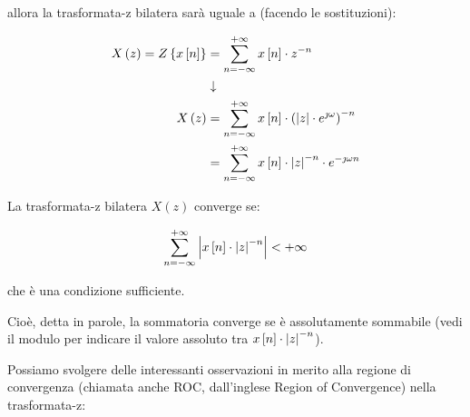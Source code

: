 allora la trasformata-z bilatera sarà uguale a (facendo le sostituzioni): 

{
    \Large 
    \begin{equation}
        \begin{split}
        X \left(z\right)
        = 
        Z \left\{ 
            x \left[ n\right]
        \right\}
        &= 
        \sum_{n = - \infty}^{+ \infty}
        x \left[ n\right]
        \cdot 
        z^{-n}
        \\
        &\downarrow
        \\
        X \left(z\right)
        &=
        \sum_{n = - \infty}^{+ \infty}
        x \left[ n\right]
        \cdot 
        \left(
            \abs{z} \cdot e^{\jmath \omega}
        \right)^{-n}
        \\
        &=
        \sum_{n = - \infty}^{+ \infty}
        x \left[ n\right]
        \cdot 
        \abs{z}^{-n} 
        \cdot 
        e^{-\jmath \omega n}
        \end{split}
    \end{equation}
}

La trasformata-z bilatera $X \left(z\right)$ converge se: 

{
    \Large 
    \begin{equation}
        \sum_{n = - \infty}^{+ \infty}
        \abs{
        x \left[ n\right]
        \cdot 
        \abs{z}^{-n}
        }
        < 
        + \infty
    \end{equation}
}

che è una condizione sufficiente. \newline 

Cioè, detta in parole, la sommatoria converge se è assolutamente sommabile (vedi il modulo per indicare il valore assoluto tra $ x \left[ n\right]\cdot \abs{z}^{-n}$). \newline 

\newpage 

Possiamo svolgere delle interessanti osservazioni in merito alla regione di convergenza (chiamata anche ROC, dall'inglese Region of Convergence) nella trasformata-z: 

